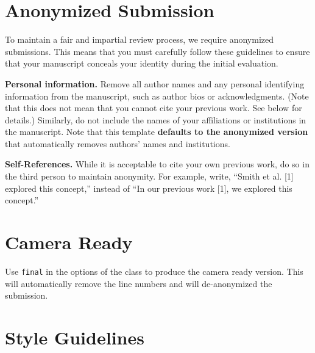 \documentclass[fullpaper]{nldl}
\begin{document}
\section{Anonymized Submission}

To maintain a fair and impartial review process, we require anonymized submissions.
This means that you must carefully follow these guidelines to ensure that your manuscript conceals your identity during the initial evaluation.

\noindent\textbf{Personal information.}
Remove all author names and any personal identifying information from the manuscript, such as author bios or acknowledgments.
(Note that this does not mean that you cannot cite your previous work.
See below for details.)
Similarly, do not include the names of your affiliations or institutions in the manuscript.
Note that this template \textbf{defaults to the anonymized version} that automatically removes authors' names and institutions.

\noindent\textbf{Self-References.}
While it is acceptable to cite your own previous work, do so in the third person to maintain anonymity.
For example, write, ``Smith et al. [1] explored this concept,'' instead of ``In our previous work [1], we explored this concept.''


\section{Camera Ready}

Use \verb|final| in the options of the class to produce the camera ready version.
This will automatically remove the line numbers and will de-anonymized the submission.

\section{Style Guidelines}
\end{document}

